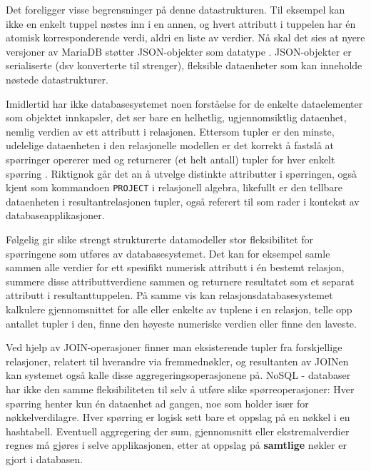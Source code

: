 Det foreligger visse begrensninger på denne datastrukturen. Til eksempel kan ikke en enkelt tuppel nøstes inn i en annen, og hvert attributt i tuppelen har én atomisk korresponderende verdi, aldri en liste av verdier. Nå skal det sies at nyere versjoner av MariaDB støtter JSON-objekter som datatype \citep{mariadb}. JSON-objekter er serialiserte (dsv konverterte til strenger), fleksible dataenheter som kan inneholde nøstede datastrukturer.

Imidlertid har ikke databasesystemet noen forståelse for de enkelte dataelementer som objektet innkapsler, det ser bare en helhetlig, ugjennomsiktlig dataenhet, nemlig verdien av ett attributt i relasjonen. Ettersom tupler er den minste, udelelige dataenheten i den relasjonelle modellen er det korrekt å fastslå at spørringer opererer med og returnerer (et helt antall) tupler for hver enkelt spørring \citep{sadalage2013}. Riktignok går det an å utvelge distinkte attributter i spørringen, også kjent som kommandoen \texttt{PROJECT} i relasjonell algebra, likefullt er den tellbare dataenheten i resultantrelasjonen tupler, også referert til som rader i kontekst av databaseapplikasjoner.

Følgelig gir slike strengt strukturerte datamodeller stor fleksibilitet for spørringene som utføres av databasesystemet. Det kan for eksempel samle sammen alle verdier for ett spesifikt numerisk attributt i én bestemt relasjon, summere disse  attributtverdiene sammen og returnere resultatet som et separat attributt i resultanttuppelen. På samme vis kan relasjonsdatabasesystemet kalkulere gjennomsnittet for alle eller enkelte av tuplene i en relasjon, telle opp antallet tupler i den, finne den høyeste numeriske verdien eller finne den laveste.

Ved hjelp av JOIN-operasjoner finner man eksisterende tupler fra forskjellige relasjoner, relatert til hverandre via fremmednøkler, og resultanten av JOINen kan systemet også kalle disse aggregeringsoperasjonene på. NoSQL - databaser har ikke den samme fleksibiliteten til selv å utføre slike spørreoperasjoner: Hver spørring henter kun én dataenhet ad gangen, noe som holder især for nøkkelverdilagre. Hver spørring er logisk sett bare et oppslag på en nøkkel i en hashtabell. Eventuell aggregering der sum, gjennomsnitt eller ekstremalverdier regnes må gjøres i selve applikasjonen, etter at oppslag på \textbf{samtlige} nøkler er gjort i databasen.

